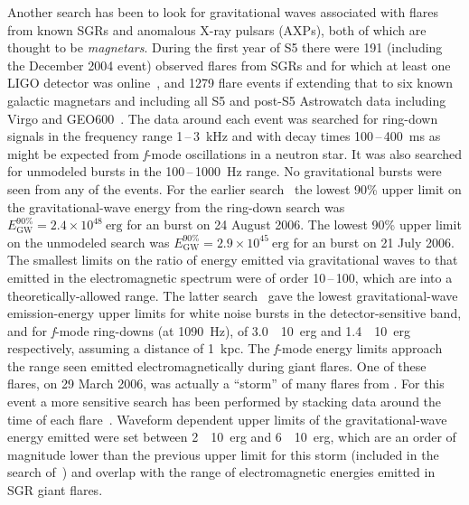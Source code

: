 Another search has been to look for gravitational waves associated with flares
from known SGRs and anomalous X-ray pulsars (AXPs), both of which are thought to
be \textit{magnetars}. During the first year of S5 there were 191 (including the
December 2004  event) observed flares from SGRs  and
 for which at least one LIGO detector was online~\cite{Abbott:2008h}, and
1279 flare events if extending that to six known galactic magnetars and
including all S5 and post-S5 Astrowatch data including Virgo and
GEO600~\cite{Abadie:2010c}. The data around each event was searched
for ring-down signals in the frequency range 1\,--\,3~kHz and with
decay times 100\,--\,400~ms as might be expected from \textit{f}-mode
oscillations in a neutron star. It was also searched for unmodeled
bursts in the 100\,--\,1000~Hz range. No gravitational bursts were
seen from any of the events. For the earlier
search~\cite{Abbott:2008h} the lowest 90\% upper limit on the
gravitational-wave energy from the ring-down search was $E_{\mathrm{GW}}^{90\%} =
2.4\times10^{48}\mathrm{\ erg}$ for an  burst on 24 August 2006. The
lowest 90\% upper limit on the unmodeled search was
$E_{\mathrm{GW}}^{90\%} = 2.9\times10^{45}\mathrm{\ erg}$ for an 
burst on 21 July 2006. The smallest limits on the ratio of energy
emitted via gravitational waves to that emitted in the electromagnetic
spectrum were of order 10\,--\,100, which are into a theoretically-allowed range. The latter search~\cite{Abadie:2010c} gave the lowest
gravitational-wave emission-energy upper limits for white noise bursts
in the detector-sensitive band, and for \textit{f}-mode ring-downs (at
1090~Hz), of 3.0~\texttimes~10~erg and
1.4~\texttimes~10~erg respectively, assuming a distance of
1~kpc. The \textit{f}-mode energy limits approach the range seen emitted
electromagnetically during giant flares. One of these flares, on 29
March 2006, was actually a ``storm'' of many flares from
. For this event a more sensitive search has been performed
by stacking data around the time of each
flare~\cite{Abbott:2009c}. Waveform dependent upper limits of the
gravitational-wave energy emitted were set between
2~\texttimes~10~erg and 6~\texttimes~10~erg, which
are an order of magnitude lower than the previous upper limit for this
storm (included in the search of~\cite{Abbott:2008h}) and overlap with
the range of electromagnetic energies emitted in SGR giant flares.


